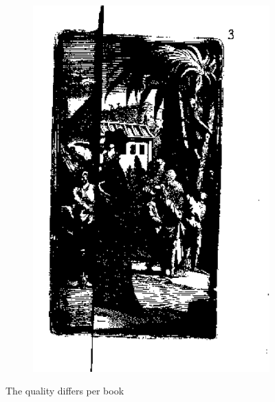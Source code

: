 \begin{figure}
\begin{subfigure}[b]{0.4\textwidth}
\includegraphics[width=\textwidth]{resources/bad_quality}
    \end{subfigure}
    \caption{The quality differs per book}
    \label{fig:qualityExamples}
\end{figure}



